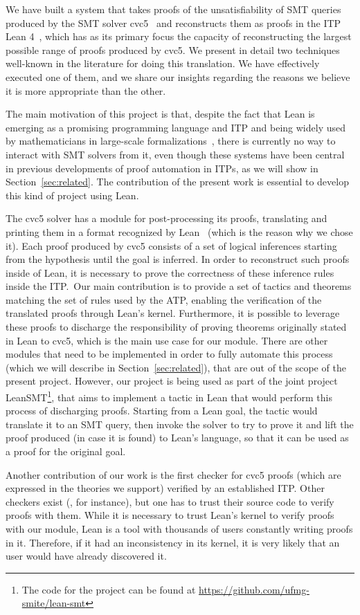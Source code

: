 We have built a system that takes proofs of the unsatisfiability of
SMT queries produced by the SMT solver cvc5~\cite{cvc5} and
reconstructs them as proofs in the ITP Lean 4~\cite{lean},
which has as its primary focus the capacity of reconstructing the largest possible
range of proofs produced by cvc5.
We present in detail two techniques well-known in the literature for doing this translation.
We have effectively executed one of them, and we share our insights
regarding the reasons we believe it is more appropriate than the other.


The main motivation of this project is that, despite the fact that Lean is
emerging as a promising programming language and ITP and being
widely used by mathematicians in large-scale
formalizations~\cite{scholze, mathlib}, there is currently no way to
interact with SMT solvers from it, even though these systems have been
central in previous developments of proof automation in ITPs, as we will show in Section~\ref{sec:related}. The contribution of the present work
is essential to develop this kind of project using Lean.

The cvc5 solver has a module for post-processing its proofs,
translating and printing them in a format recognized by Lean~\cite{Barbosa2022} (which is the reason why we chose it).
Each proof produced by cvc5 consists of a set of logical inferences starting from the
hypothesis until the goal is inferred. In order to reconstruct such proofs inside of
Lean, it is necessary to prove the correctness of these inference rules inside the
ITP.\
Our main contribution is to provide a set of tactics and theorems matching the set
of rules used by the ATP, enabling the verification of the translated proofs through Lean's kernel.
Furthermore, it is possible to leverage these proofs to discharge the
responsibility of proving theorems originally stated in Lean to cvc5, which is
the main use case for our module. There are other modules that need to be implemented
in order to fully automate this process (which we will describe in Section~\ref{sec:related}), that are out of the scope of the present project.
However, our project is being used as part of the joint project
LeanSMT\footnote{The code for the project can be found at \url{https://github.com/ufmg-smite/lean-smt}}, that aims to implement a tactic in Lean
that would perform this process of discharging proofs. Starting from a Lean goal, the tactic would translate
it to an SMT query, then invoke the solver to try to prove it and lift the proof produced
(in case it is found) to Lean's language, so that it can be used as a proof for the original
goal.

Another contribution of our work is the first checker for cvc5 proofs
(which are expressed in the theories we support)
verified by an established ITP.
Other checkers exist (\cite{carcara}, for instance), but one has to
trust their source code to verify proofs with them. While it is necessary
to trust Lean's kernel to verify proofs with our module, Lean is a tool
with thousands of users constantly writing proofs in it. Therefore,
if it had an inconsistency in its kernel, it is very likely that
an user would have already discovered it.
